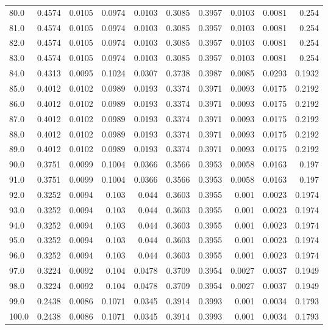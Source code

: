 \begin{longtable}{lrrrrrrrrr}
80.0 & 0.4574 & 0.0105 & 0.0974 & 0.0103 & 0.3085 & 0.3957 & 0.0103 & 0.0081 & 0.254 \\
81.0 & 0.4574 & 0.0105 & 0.0974 & 0.0103 & 0.3085 & 0.3957 & 0.0103 & 0.0081 & 0.254 \\
82.0 & 0.4574 & 0.0105 & 0.0974 & 0.0103 & 0.3085 & 0.3957 & 0.0103 & 0.0081 & 0.254 \\
83.0 & 0.4574 & 0.0105 & 0.0974 & 0.0103 & 0.3085 & 0.3957 & 0.0103 & 0.0081 & 0.254 \\
84.0 & 0.4313 & 0.0095 & 0.1024 & 0.0307 & 0.3738 & 0.3987 & 0.0085 & 0.0293 & 0.1932 \\
85.0 & 0.4012 & 0.0102 & 0.0989 & 0.0193 & 0.3374 & 0.3971 & 0.0093 & 0.0175 & 0.2192 \\
86.0 & 0.4012 & 0.0102 & 0.0989 & 0.0193 & 0.3374 & 0.3971 & 0.0093 & 0.0175 & 0.2192 \\
87.0 & 0.4012 & 0.0102 & 0.0989 & 0.0193 & 0.3374 & 0.3971 & 0.0093 & 0.0175 & 0.2192 \\
88.0 & 0.4012 & 0.0102 & 0.0989 & 0.0193 & 0.3374 & 0.3971 & 0.0093 & 0.0175 & 0.2192 \\
89.0 & 0.4012 & 0.0102 & 0.0989 & 0.0193 & 0.3374 & 0.3971 & 0.0093 & 0.0175 & 0.2192 \\
90.0 & 0.3751 & 0.0099 & 0.1004 & 0.0366 & 0.3566 & 0.3953 & 0.0058 & 0.0163 & 0.197 \\
91.0 & 0.3751 & 0.0099 & 0.1004 & 0.0366 & 0.3566 & 0.3953 & 0.0058 & 0.0163 & 0.197 \\
92.0 & 0.3252 & 0.0094 & 0.103 & 0.044 & 0.3603 & 0.3955 & 0.001 & 0.0023 & 0.1974 \\
93.0 & 0.3252 & 0.0094 & 0.103 & 0.044 & 0.3603 & 0.3955 & 0.001 & 0.0023 & 0.1974 \\
94.0 & 0.3252 & 0.0094 & 0.103 & 0.044 & 0.3603 & 0.3955 & 0.001 & 0.0023 & 0.1974 \\
95.0 & 0.3252 & 0.0094 & 0.103 & 0.044 & 0.3603 & 0.3955 & 0.001 & 0.0023 & 0.1974 \\
96.0 & 0.3252 & 0.0094 & 0.103 & 0.044 & 0.3603 & 0.3955 & 0.001 & 0.0023 & 0.1974 \\
97.0 & 0.3224 & 0.0092 & 0.104 & 0.0478 & 0.3709 & 0.3954 & 0.0027 & 0.0037 & 0.1949 \\
98.0 & 0.3224 & 0.0092 & 0.104 & 0.0478 & 0.3709 & 0.3954 & 0.0027 & 0.0037 & 0.1949 \\
99.0 & 0.2438 & 0.0086 & 0.1071 & 0.0345 & 0.3914 & 0.3993 & 0.001 & 0.0034 & 0.1793 \\
100.0 & 0.2438 & 0.0086 & 0.1071 & 0.0345 & 0.3914 & 0.3993 & 0.001 & 0.0034 & 0.1793 \\

\end{longtable}
